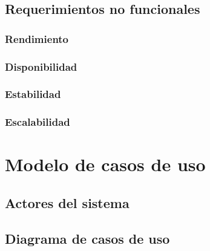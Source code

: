 \subsection{Requerimientos no funcionales}
\subsubsection*{Rendimiento}
\subsubsection*{Disponibilidad}
\subsubsection*{Estabilidad}
\subsubsection*{Escalabilidad}




\section{Modelo de casos de uso}

\subsection{Actores del sistema}

\subsection{Diagrama de casos de uso}



